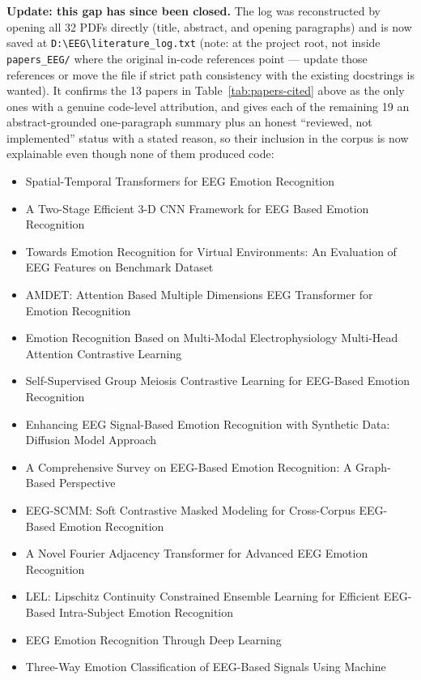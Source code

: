 \documentclass[11pt]{report}
\begin{document}
\textbf{Update: this gap has since been closed.} The log was reconstructed
by opening all 32 PDFs directly (title, abstract, and opening paragraphs)
and is now saved at \texttt{D:\textbackslash EEG\textbackslash literature\_log.txt} (note: at
the project root, not inside \texttt{papers\_EEG/} where the original
in-code references point --- update those references or move the file if
strict path consistency with the existing docstrings is wanted). It
confirms the 13 papers in Table~\ref{tab:papers-cited} above as the only
ones with a genuine code-level attribution, and gives each of the remaining
19 an abstract-grounded one-paragraph summary plus an honest
``reviewed, not implemented'' status with a stated reason, so their
inclusion in the corpus is now explainable even though none of them
produced code:
\begin{itemize}[itemsep=0pt]
  \item Spatial-Temporal Transformers for EEG Emotion Recognition
  \item A Two-Stage Efficient 3-D CNN Framework for EEG Based Emotion Recognition
  \item Towards Emotion Recognition for Virtual Environments: An Evaluation
        of EEG Features on Benchmark Dataset
  \item AMDET: Attention Based Multiple Dimensions EEG Transformer for
        Emotion Recognition
  \item Emotion Recognition Based on Multi-Modal Electrophysiology
        Multi-Head Attention Contrastive Learning
  \item Self-Supervised Group Meiosis Contrastive Learning for EEG-Based
        Emotion Recognition
  \item Enhancing EEG Signal-Based Emotion Recognition with Synthetic Data:
        Diffusion Model Approach
  \item A Comprehensive Survey on EEG-Based Emotion Recognition: A
        Graph-Based Perspective
  \item EEG-SCMM: Soft Contrastive Masked Modeling for Cross-Corpus
        EEG-Based Emotion Recognition
  \item A Novel Fourier Adjacency Transformer for Advanced EEG Emotion
        Recognition
  \item LEL: Lipschitz Continuity Constrained Ensemble Learning for
        Efficient EEG-Based Intra-Subject Emotion Recognition
  \item EEG Emotion Recognition Through Deep Learning
  \item Three-Way Emotion Classification of EEG-Based Signals Using Machine

\end{itemize}
\end{document}
